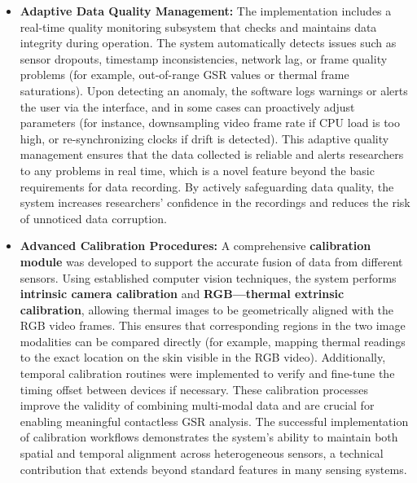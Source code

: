 \documentclass[11pt,a4paper]{report}
\begin{document}
\begin{itemize}
\item \textbf{Adaptive Data Quality Management:} The implementation includes a
  real-time quality monitoring subsystem that checks and maintains data
  integrity during operation. The system automatically detects issues
  such as sensor dropouts, timestamp inconsistencies, network lag, or
  frame quality problems (for example, out-of-range GSR values or
  thermal frame saturations). Upon detecting an anomaly, the software
  logs warnings or alerts the user via the interface, and in some cases
  can proactively adjust parameters (for instance, downsampling video
  frame rate if CPU load is too high, or re-synchronizing clocks if
  drift is detected). This adaptive quality management ensures that the
  data collected is reliable and alerts researchers to any problems in
  real time, which is a novel feature beyond the basic requirements for
  data recording. By actively safeguarding data quality, the system
  increases researchers' confidence in the recordings and reduces the
  risk of unnoticed data corruption.

\item \textbf{Advanced Calibration Procedures:} A comprehensive \textbf{calibration
  module} was developed to support the accurate fusion of data from
  different sensors. Using established computer vision techniques, the
  system performs \textbf{intrinsic camera calibration} and \textbf{RGB---thermal
  extrinsic calibration}, allowing thermal images to be geometrically
  aligned with the RGB video frames. This ensures that corresponding
  regions in the two image modalities can be compared directly (for
  example, mapping thermal readings to the exact location on the skin
  visible in the RGB video). Additionally, temporal calibration routines
  were implemented to verify and fine-tune the timing offset between
  devices if necessary. These calibration processes improve the validity
  of combining multi-modal data and are crucial for enabling meaningful
  contactless GSR analysis. The successful implementation of calibration
  workflows demonstrates the system's ability to maintain both spatial
  and temporal alignment across heterogeneous sensors, a technical
  contribution that extends beyond standard features in many sensing
  systems.


\end{itemize}
\end{document}
